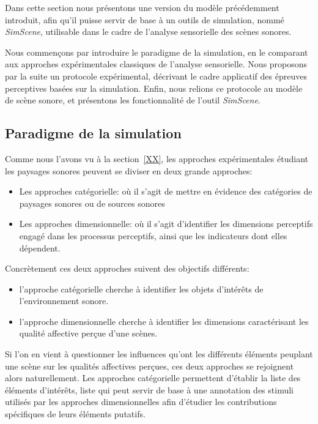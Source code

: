 Dans cette section nous présentons une version du modèle précédemment introduit, afin qu'il puisse servir de base à  un outils de simulation, nommé \emph{SimScene}, utilisable dans le cadre de l'analyse sensorielle des scènes sonores.

Nous commençons par introduire le paradigme de la simulation, en le comparant aux approches expérimentales classiques  de  l'analyse sensorielle. Nous proposons par la suite un protocole expérimental, décrivant le cadre applicatif des épreuves perceptives basées sur la simulation. Enfin, nous relions ce protocole au modèle de scène sonore, et présentons les fonctionnalité de l'outil \emph{SimScene}.

\subsection{Paradigme de la simulation}

Comme nous l'avons vu à la section~\ref{XX}, les approches expérimentales étudiant les paysages sonores peuvent se diviser en deux grande approches:

\begin{itemize}
\item Les approches catégorielle: où il s'agit de mettre en évidence des catégories de paysages sonores ou de sources sonores
\item Les approches dimensionnelle: où il s'agit d'identifier les dimensions perceptifs engagé dans les processus perceptifs, ainsi que les indicateurs dont elles dépendent.
\end{itemize}

Concrètement ces deux approches suivent des objectifs différents: 

\begin{itemize}
\item l'approche catégorielle cherche à identifier les objets d'intérêts de l'environnement sonore.
\item l'approche dimensionnelle cherche à identifier les dimensions caractérisant les qualité affective perçue d'une scènes.
\end{itemize}

Si l'on  en vient à questionner les influences qu'ont les différents éléments peuplant une scène sur les qualités affectives perçues, ces deux approches se rejoignent alors naturellement. Les approches catégorielle permettent d'établir la liste des éléments d'intérêts, liste qui peut servir de base à une annotation des stimuli utilisés par les approches dimensionnelles afin d'étudier les contributions spécifiques de leurs éléments putatifs.

